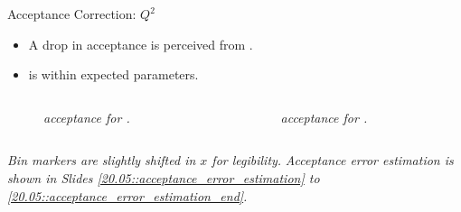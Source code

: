 \begin{frame}{Acceptance Correction: $Q^2$}
    \label{11.52::electron_variables}

    \begin{itemize}
        \item
            A drop in  acceptance is perceived from .

        \item
            \ef{$\nu$} is within expected parameters.
    \end{itemize}

    \vspace{-12pt}
    \begin{columns}[onlytextwidth,T]

    \begin{column}{.49\linewidth}
        \begin{center}
            \begin{figure}[t]
                \textit{ acceptance for .}
            \end{figure}
        \end{center}
    \end{column}

    \begin{column}{.49\linewidth}
        \begin{center}
            \begin{figure}[t]
                \textit{\ef{$\nu$} acceptance for .}
            \end{figure}
        \end{center}
    \end{column}

    \end{columns}

    \begin{flushright}
        \tiny{\textit{Bin markers are slightly shifted in $x$ for legibility.}}
        \tiny{\textit{Acceptance error estimation is shown in Slides \textcolor{efd_purple}{\ref{20.05::acceptance_error_estimation}} to \textcolor{efd_purple}{\ref{20.05::acceptance_error_estimation_end}}.}}
    \end{flushright}
\end{frame}

